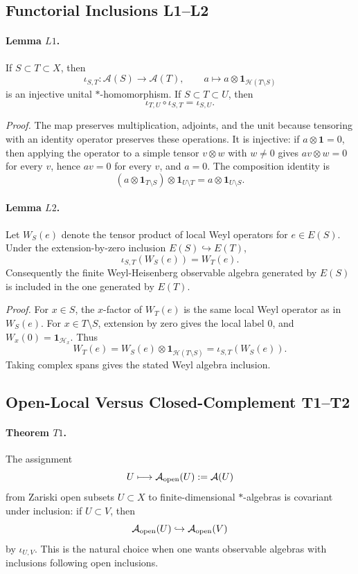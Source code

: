 \subsection{Functorial Inclusions L1--L2}

\paragraph{Lemma \(L1\).}
If \(S\subset T\subset X\), then
\[
  \iota_{S,T}:\mathcal A(S)\longrightarrow\mathcal A(T),\qquad
  a\longmapsto a\otimes\mathbf 1_{\mathcal H(T\setminus S)}
\]
is an injective unital \(*\)-homomorphism.  If \(S\subset T\subset U\), then
\[
  \iota_{T,U}\circ\iota_{S,T}=\iota_{S,U}.
\]

\emph{Proof.}
The map preserves multiplication, adjoints, and the unit because tensoring
with an identity operator preserves these operations.  It is injective:
if \(a\otimes\mathbf 1=0\), then applying the operator to a simple tensor
\(v\otimes w\) with \(w\ne0\) gives \(av\otimes w=0\) for every \(v\), hence
\(av=0\) for every \(v\), and \(a=0\).  The composition identity is
\[
  (a\otimes\mathbf 1_{T\setminus S})\otimes\mathbf 1_{U\setminus T}
  =
  a\otimes\mathbf 1_{U\setminus S}.
\]

\paragraph{Lemma \(L2\).}
Let \(W_S(e)\) denote the tensor product of local Weyl operators for
\(e\in E(S)\).  Under the extension-by-zero inclusion
\(E(S)\hookrightarrow E(T)\),
\[
  \iota_{S,T}(W_S(e))=W_T(e).
\]
Consequently the finite Weyl-Heisenberg observable algebra generated by
\(E(S)\) is included in the one generated by \(E(T)\).

\emph{Proof.}
For \(x\in S\), the \(x\)-factor of \(W_T(e)\) is the same local Weyl operator
as in \(W_S(e)\).  For \(x\in T\setminus S\), extension by zero gives the
local label \(0\), and \(W_x(0)=\mathbf 1_{\mathcal H_x}\).  Thus
\[
  W_T(e)=W_S(e)\otimes\mathbf 1_{\mathcal H(T\setminus S)}
         =\iota_{S,T}(W_S(e)).
\]
Taking complex spans gives the stated Weyl algebra inclusion.

\subsection{Open-Local Versus Closed-Complement T1--T2}

\paragraph{Theorem \(T1\).}
The assignment
\[
  U\longmapsto\mathcal A_{\rm open}(U):=\mathcal A(U)
\]
from Zariski open subsets \(U\subset X\) to finite-dimensional
\(*\)-algebras is covariant under inclusion: if \(U\subset V\), then
\[
  \mathcal A_{\rm open}(U)\hookrightarrow\mathcal A_{\rm open}(V)
\]
by \(\iota_{U,V}\).  This is the natural choice when one wants observable
algebras with inclusions following open inclusions.

